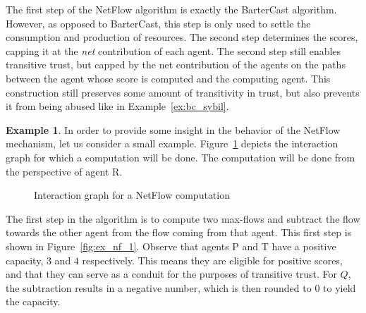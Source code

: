 \documentclass[a4paper,11pt]{book}
\theoremstyle{definition}
\newtheorem*{example}{Example}
\begin{document}
The first step of the NetFlow algorithm is exactly the BarterCast algorithm. However,
as opposed to BarterCast, this step is only used to settle the consumption and production
of resources. The second step determines the scores, capping it at the \emph{net} contribution
of each agent. The second step still enables transitive trust, but capped by the net contribution
of the agents on the paths between the agent whose score is computed and the computing agent.
This construction still preserves some amount of transitivity in trust, but also prevents it
from being abused like in Example~\ref{ex:bc_sybil}.

\begin{example}
 In order to provide some insight in the behavior of the NetFlow mechanism, let us consider a
small example. Figure~\ref{fig:ex_ig_for_nf} depicts the interaction graph for which a computation
will be done. The computation will be done from the perspective of agent R.

\begin{figure}[h]
    \centering
     \caption{Interaction graph for a NetFlow computation}
     \label{fig:ex_ig_for_nf}
\end{figure}

The first step in the algorithm is to compute two max-flows and subtract the flow towards
the other agent from the flow coming from that agent. This first step is shown in Figure~\ref{fig:ex_nf_1}.
Observe that agents P and T have a positive capacity, $3$ and $4$ respectively. 
This means they are eligible for positive
scores, and that they can serve as a conduit for the purposes of transitive trust. For $Q$, the
subtraction results in a negative number, which is then rounded to $0$ to yield the capacity.


\end{example}
\end{document}
